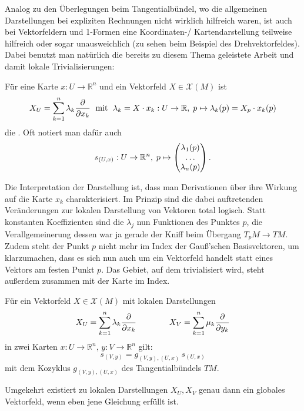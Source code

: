 \documentclass[../H_Analysis_main.tex]{subfiles}
\begin{document}
Analog zu den Überlegungen beim Tangentialbündel, wo die allgemeinen Darstellungen bei expliziten Rechnungen nicht wirklich hilfreich waren, ist auch bei Vektorfeldern und 1-Formen eine Koordinaten-/ Kartendarstellung teilweise hilfreich oder sogar unausweichlich (zu sehen beim Beispiel des Drehvektorfeldes). Dabei benutzt man natürlich die bereits zu diesem Thema geleistete Arbeit und damit lokale Trivialisierungen:

\begin{defi}
Für eine Karte $x: U \rightarrow \mathbb{R}^n$ und ein Vektorfeld $X \in \mathcal{X}(M)$ ist
\begin{equation}
X_U = \sum_{k = 1}^n \lambda_k \pdv{x_k} \; \text{ mit } \; \lambda_k = X \cdot x_k: U \rightarrow \mathbb{R}, \; p \mapsto \lambda_k(p) = X_p \cdot x_k(p)
\end{equation}
die . Oft notiert man dafür auch
\begin{equation}
s_{(U, x)}: U \rightarrow \mathbb{R}^n, \; p \mapsto \mqty(\lambda_1(p) \\ \dots \\ \lambda_n(p)) \, .
\end{equation}
\end{defi}
Die Interpretation der Darstellung ist, dass man Derivationen über ihre Wirkung auf die Karte $x_k$ charakterisiert. Im Prinzip sind die dabei auftretenden Veränderungen zur lokalen Darstellung von Vektoren total logisch. Statt konstanten Koeffizienten sind die $\lambda_j$ nun Funktionen des Punktes $p$, die Verallgemeinerung dessen war ja gerade der Kniff beim Übergang $T_p M \rightarrow TM$. Zudem steht der Punkt $p$ nicht mehr im Index der Gauß'schen Basisvektoren, um klarzumachen, dass es sich nun auch um ein Vektorfeld handelt statt eines Vektors am festen Punkt $p$. Das Gebiet, auf dem trivialisiert wird, steht außerdem zusammen mit der Karte im Index.


\begin{satz}
Für ein Vektorfeld $X \in \mathcal{X}(M)$ mit lokalen Darstellungen
\begin{equation*}
X_U = \sum_{k = 1}^n \lambda_k \pdv{x_k} \qquad \qquad X_V = \sum_{k = 1}^n \mu_k \pdv{y_k}
\end{equation*}
in zwei Karten $x: U \rightarrow \mathbb{R}^n, \, y: V \rightarrow \mathbb{R}^n$ gilt:
\begin{equation}
s_{(V, y)} = g_{(V, y), (U, x)} \, s_{(U, x)}
\end{equation}
mit dem Kozyklus $g_{(V, y), (U, x)}$ des Tangentialbündels $TM$.

Umgekehrt existiert zu lokalen Darstellungen $X_U, X_V$ genau dann ein globales Vektorfeld, wenn eben jene Gleichung erfüllt ist.
\end{satz}
\end{document}
